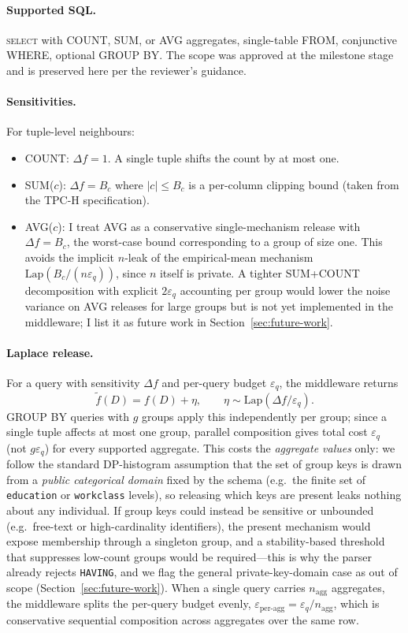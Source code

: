 \documentclass[sigconf,nonacm]{acmart}
\newcommand{\eps}{\varepsilon}
\newcommand{\Lap}{\mathrm{Lap}}
\begin{document}
\paragraph{Supported SQL.}
\textsc{select} with COUNT, SUM, or AVG aggregates, single-table FROM, conjunctive WHERE, optional GROUP BY. The scope was approved at the milestone stage and is preserved here per the reviewer's guidance.

\paragraph{Sensitivities.}
For tuple-level neighbours:
\begin{itemize}
    \item COUNT: $\Delta f = 1$. A single tuple shifts the count by at most one.
    \item SUM($c$): $\Delta f = B_c$ where $|c| \leq B_c$ is a per-column clipping bound (taken from the TPC-H specification).
    \item AVG($c$): I treat AVG as a conservative single-mechanism release with $\Delta f = B_c$, the worst-case bound corresponding to a group of size one. This avoids the implicit $n$-leak of the empirical-mean mechanism $\Lap(B_c/(n\eps_q))$, since $n$ itself is private. A tighter SUM+COUNT decomposition with explicit $2\eps_q$ accounting per group would lower the noise variance on AVG releases for large groups but is not yet implemented in the middleware; I list it as future work in Section~\ref{sec:future-work}.
\end{itemize}

\paragraph{Laplace release.} For a query with sensitivity $\Delta f$ and per-query budget $\eps_q$, the middleware returns
\begin{equation}
\tilde f(D) = f(D) + \eta, \qquad \eta \sim \Lap(\Delta f / \eps_q).
\end{equation}
GROUP BY queries with $g$ groups apply this independently per group; since a single tuple affects at most one group, parallel composition gives total cost $\eps_q$ (not $g\eps_q$) for every supported aggregate. This costs the \emph{aggregate values} only: we follow the standard DP-histogram assumption that the set of group keys is drawn from a \emph{public categorical domain} fixed by the schema (e.g.\ the finite set of \texttt{education} or \texttt{workclass} levels), so releasing which keys are present leaks nothing about any individual. If group keys could instead be sensitive or unbounded (e.g.\ free-text or high-cardinality identifiers), the present mechanism would expose membership through a singleton group, and a stability-based threshold that suppresses low-count groups would be required---this is why the parser already rejects \texttt{HAVING}, and we flag the general private-key-domain case as out of scope (Section~\ref{sec:future-work}). When a single query carries $n_{\mathrm{agg}}$ aggregates, the middleware splits the per-query budget evenly, $\eps_{\mathrm{per\text{-}agg}} = \eps_q / n_{\mathrm{agg}}$, which is conservative sequential composition across aggregates over the same row.
\end{document}
